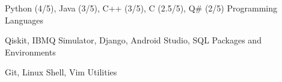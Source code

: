

\begin{cventries}

  \cventry
    {Python (4/5), Java (3/5), C++ (3/5), C (2.5/5), Q# (2/5)} %
    {Programming Languages} %
    {} %
    {} %
    {}
    
  \cventry
    {Qiskit, IBMQ Simulator, Django, Android Studio, SQL} %
    {Packages and Environments} %
    {} %
    {} %
    {}

  \cventry
    {Git, Linux Shell, Vim} %
    {Utilities} %
    {} %
    {} %
    {}

\end{cventries}
